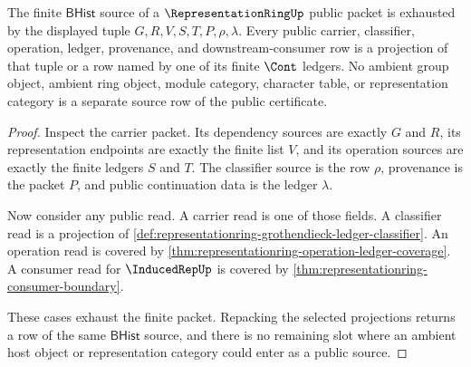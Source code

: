 \begin{theorem}
\label{thm:representationring-bhist-finite-source-exhaustion}
The finite $\mathsf{BHist}$ source of a $\RepresentationRingUp$ public packet
is exhausted by the displayed tuple
$G,R,V,S,T,P,\rho,\lambda$. Every public carrier, classifier, operation,
ledger, provenance, and downstream-consumer row is a projection of that tuple
or a row named by one of its finite $\Cont$ ledgers. No ambient group object,
ambient ring object, module category, character table, or representation
category is a separate source row of the public certificate.
\end{theorem}
\begin{proof}
Inspect the carrier packet. Its dependency sources are exactly $G$ and $R$,
its representation endpoints are exactly the finite list $V$, and its
operation sources are exactly the finite ledgers $S$ and $T$. The classifier
source is the row $\rho$, provenance is the packet $P$, and public
continuation data is the ledger $\lambda$.

Now consider any public read. A carrier read is one of those fields. A
classifier read is a projection of
\autoref{def:representationring-grothendieck-ledger-classifier}. An operation
read is covered by \autoref{thm:representationring-operation-ledger-coverage}.
A consumer read for $\InducedRepUp$ is covered by
\autoref{thm:representationring-consumer-boundary}.

These cases exhaust the finite packet. Repacking the selected projections
returns a row of the same $\mathsf{BHist}$ source, and there is no remaining
slot where an ambient host object or representation category could enter as a
public source.
\end{proof}

